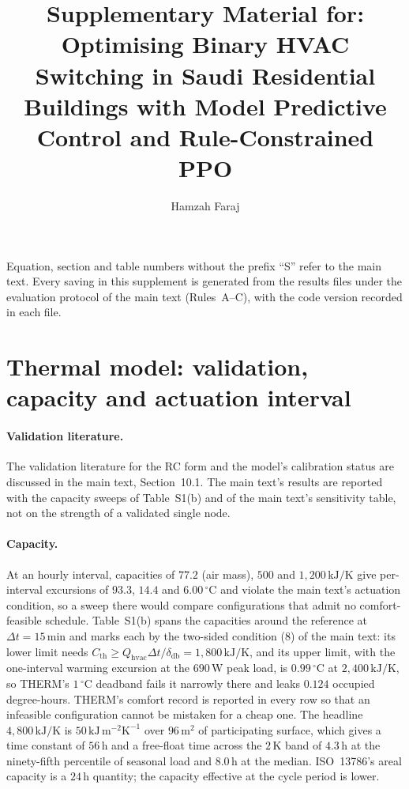 \documentclass[11pt]{article}
\title{Supplementary Material for: Optimising Binary HVAC Switching in Saudi
Residential Buildings with Model Predictive Control and Rule-Constrained PPO}
\author{Hamzah Faraj}
\date{}
\newcommand{\deadband}{\delta_{\mathrm{db}}}
\newcommand{\Cth}{C_{\mathrm{th}}}
\newcommand{\Qhvac}{Q_{\mathrm{hvac}}}
\begin{document}
\maketitle

Equation, section and table numbers without the prefix ``S'' refer to the main text. Every saving in this supplement is generated from the results files under the evaluation protocol of the main text (Rules~A--C), with the code version recorded in each file.

\section{Thermal model: validation, capacity and actuation interval}
\label{sec:s-model}

\paragraph{Validation literature.} The validation literature for the RC form
and the model's calibration status are discussed in the main text, Section~10.1. The main text's results are reported with the capacity sweeps of Table~S1(b) and of the main text's sensitivity table, not on the strength of a validated single node.

\paragraph{Capacity.} At an hourly interval, capacities of $77.2$ (air mass),
$500$ and $1{,}200\,\text{kJ/K}$ give per-interval excursions of $93.3$, $14.4$ and $6.00\,^\circ$C and violate the main text's actuation condition, so a sweep there would compare configurations that admit no comfort-feasible schedule. Table~S1(b) spans the capacities around the reference at $\Delta t=15\,$min and marks each by the two-sided condition (8) of the main text: its lower limit needs $\Cth\ge\Qhvac\Delta t/\deadband=1{,}800\,\text{kJ/K}$, and its upper limit, with the one-interval warming excursion at the $690\,$W peak load, is $0.99\,^\circ$C at $2{,}400\,\text{kJ/K}$, so THERM's $1\,^\circ$C deadband fails it narrowly there and leaks $0.124$ occupied degree-hours. THERM's comfort record is reported in every row so that an infeasible configuration cannot be mistaken for a cheap one. The headline $4{,}800\,\text{kJ/K}$ is $50\,\text{kJ}\, \text{m}^{-2}\text{K}^{-1}$ over $96\,\text{m}^2$ of participating surface, which gives a time constant of $56\,$h and a free-float time across the $2\,$K band of $4.3\,$h at the ninety-fifth percentile of seasonal load and $8.0\,$h at the median. ISO~13786's areal capacity is a $24\,$h quantity; the capacity effective at the cycle period is lower.
\end{document}

